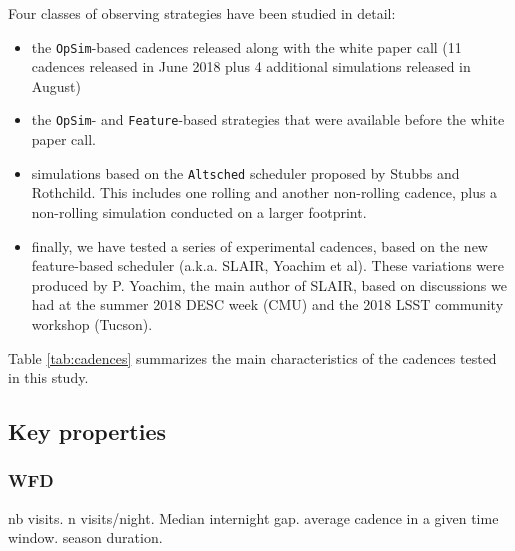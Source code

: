 \documentclass [11pt,a4paper]{article}
\begin{document}
Four classes of observing strategies have been studied in detail:
\begin{itemize}

\item the {\tt OpSim}-based cadences released along with the white
  paper call (11 cadences released in June 2018 plus 4 additional
  simulations released in August)
  
\item the {\tt OpSim}- and {\tt Feature}-based strategies that were
  available before the white paper call. 

\item simulations based on the {\tt Altsched} scheduler proposed by
  Stubbs and Rothchild.  This includes one rolling and another
  non-rolling cadence, plus a non-rolling simulation conducted on a
  larger footprint.

\item finally, we have tested a series of experimental cadences, based
  on the new feature-based scheduler (a.k.a.  SLAIR, Yoachim et
  al). These variations were produced by P. Yoachim, the main author
  of SLAIR, based on discussions we had at the summer 2018 DESC week
  (CMU) and the 2018 LSST community workshop (Tucson).
\end{itemize}

Table \ref{tab:cadences} summarizes the main characteristics of the
cadences tested in this study.

\subsection {Key properties}

\subsubsection {WFD}

  


nb visits. n visits/night. Median internight gap. average cadence in a given time window. season duration. 
\end{document}

